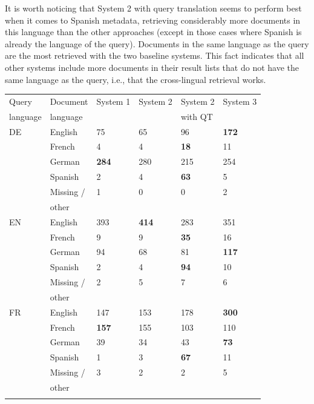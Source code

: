 \documentclass[a4paper,11pt]{article}
\begin{document}
It is worth noticing that System 2 with query translation seems to perform best when it comes to Spanish metadata, retrieving considerably more documents in this language than the other approaches (except in those cases where Spanish is already the language of the query). Documents in the same language as the query are the most retrieved with the two baseline systems. This fact indicates that all other systems include more documents in their result lists that do not have the same language as the query, i.e., that the cross-lingual retrieval works.

\begin{table}[ht]
    \centering
    \begin{tabularx}{0.81\textwidth}{llllll}
\addlinespace
\toprule
\addlinespace
Query & Document & System 1 & System 2 & System 2 & System 3 \\
language & language & & & with QT & \\
\addlinespace
\cmidrule{1-6}
\addlinespace
DE & English & 75 & 65 & 96 & \textbf{172}  \\
\addlinespace
& French & 4 & 4 & \textbf{18} & 11 \\
\addlinespace
& German & \textbf{284} & 280 & 215 & 254 \\
\addlinespace
& Spanish & 2 & 4 & \textbf{63} & 5 \\
\addlinespace
& Missing / & 1 & 0 & 0 & 2 \\
& other & & & & \\
\addlinespace
EN & English & 393 & \textbf{414} & 283 & 351 \\
\addlinespace
& French & 9 & 9 & \textbf{35} & 16 \\
\addlinespace
& German & 94 & 68 & 81 & \textbf{117} \\
\addlinespace
& Spanish & 2 & 4 & \textbf{94} & 10 \\
\addlinespace
& Missing / & 2 & 5 & 7 & 6 \\
& other & & & & \\
\addlinespace
FR & English & 147 & 153 & 178 & \textbf{300} \\
\addlinespace
& French & \textbf{157} & 155 & 103 & 110 \\
\addlinespace
& German & 39 & 34 & 43 & \textbf{73} \\
\addlinespace
& Spanish & 1 & 3 & \textbf{67} & 11 \\
\addlinespace
& Missing / & 3 & 2 & 2 & 5 \\
&  other &&&& \\
\addlinespace

\end{tabularx}
\end{table}
\end{document}
